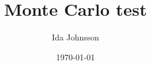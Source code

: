 \documentclass[12pt]{article}
\begin{document}
\title{Monte Carlo test}
\author{Ida Johnsson}
\date{\today}
\maketitle
\noindent
{}
\clearpage

\end{document}
